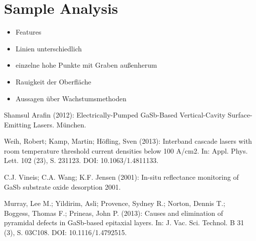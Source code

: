 \documentclass[paper=a4,fontsize=10pt,DIV=18,twocolumn,parskip=half]{scrartcl}
\numberwithin{equation}{section}    %
\begin{document}
\section{Sample Analysis}

\begin{itemize}
\item Features\\
\item Linien unterschiedlich\\

\item einzelne hohe Punkte mit Graben außenherum\\

\item Rauigkeit der Oberfläche\\
\item Aussagen über Wachstumsmethoden\\
\end{itemize}

\begin{thebibliography}{}   

 Shamsul Arafin (2012): Electrically-Pumped GaSb-Based 
Vertical-Cavity Surface-Emitting Lasers. München.

 Weih, Robert; Kamp, Martin; Höfling, Sven (2013): Interband 
cascade lasers with room temperature threshold current densities below 100 
A/cm2. In: Appl. Phys. Lett. 102 (23), S. 231123. DOI: 10.1063/1.4811133.

 C.J. Vineis; C.A. Wang; K.F. Jensen (2001): In-situ reflectance 
monitoring of GaSb substrate oxide desorption 2001.

 Murray, Lee M.; Yildirim, Asli; Provence, Sydney R.; Norton, 
Dennis T.; Boggess, Thomas F.; Prineas, John P. (2013): Causes and elimination 
of pyramidal defects in GaSb-based epitaxial layers. In: J. Vac. Sci. Technol. B 
31 (3), S. 03C108. DOI: 10.1116/1.4792515.
  

\end{thebibliography}
%
%
\onecolumn
\pagestyle{empty}
\appendix
\label{appendix}

\end{document}
